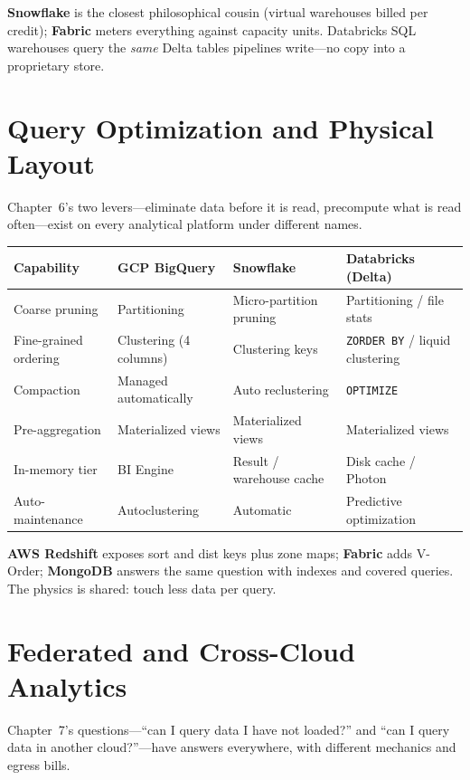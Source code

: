 \noindent \textbf{Snowflake} is the closest philosophical cousin (virtual warehouses billed per
credit); \textbf{Fabric} meters everything against capacity units. Databricks SQL warehouses query
the \emph{same} Delta tables pipelines write---no copy into a proprietary store.

\section{Query Optimization and Physical Layout}
%
Chapter~6's two levers---eliminate data before it is read, precompute what is read often---exist
on every analytical platform under different names.

\begin{center}
\footnotesize
\begin{tabular}{@{}p{2.8cm}p{3.0cm}p{3.0cm}p{3.4cm}@{}}
\toprule
\textbf{Capability} & \textbf{GCP BigQuery} & \textbf{Snowflake} & \textbf{Databricks (Delta)} \\
\midrule
Coarse pruning & Partitioning & Micro-partition pruning & Partitioning / file stats \\
Fine-grained ordering & Clustering (4 columns) & Clustering keys & \texttt{ZORDER BY} / liquid clustering \\
Compaction & Managed automatically & Auto reclustering & \texttt{OPTIMIZE} \\
Pre-aggregation & Materialized views & Materialized views & Materialized views \\
In-memory tier & BI Engine & Result / warehouse cache & Disk cache / Photon \\
Auto-maintenance & Autoclustering & Automatic & Predictive optimization \\
\bottomrule
\end{tabular}
\end{center}

\noindent \textbf{AWS Redshift} exposes sort and dist keys plus zone maps; \textbf{Fabric} adds
V-Order; \textbf{MongoDB} answers the same question with indexes and covered queries. The physics
is shared: touch less data per query.

\section{Federated and Cross-Cloud Analytics}
%
Chapter~7's questions---``can I query data I have not loaded?'' and ``can I query data in another
cloud?''---have answers everywhere, with different mechanics and egress bills.

